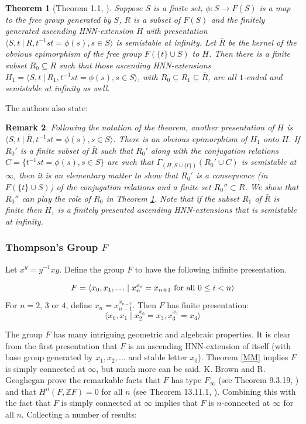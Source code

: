 \documentclass[12pt]{article}
\newtheorem{theorem}{Theorem}[subsection]
\newtheorem{remark}[theorem]{Remark}
\begin{document}
\begin{theorem} [Theorem 1.1, \cite{LM23}]  \label{thmfg} Suppose $S$ is a finite set, $\phi : S \to F(S)$ is a map to the free group generated by $S$, $R$ is a subset of $F(S)$ and the finitely generated ascending HNN-extension $H$ with presentation $\langle S, t \ |\  R, t^{-1} s t = \phi(s), s \in S \rangle$ is semistable at infinity. Let $\bar R$ be the kernel of the obvious epimorphism of the free group $F(\{t\}\cup S)$ to $H$.  Then there is a finite subset $R_0 \subseteq R$ such that those ascending HNN-extensions $H_1=\langle S, t \ |\  R_1, t^{-1} s t = \phi(s), s \in S \rangle$, with $R_0 \subseteq R_1 \subseteq \bar R$, are all $1$-ended and semistable at infinity as well. \end{theorem}
The authors also state:
\begin{remark}
Following the notation of the theorem, another presentation of $H$ is $\langle S, t \ |\  \bar R, t^{-1} s t = \phi(s), s \in S \rangle$. There is an  obvious epimorphism of $H_1$ onto $H$. If $R_0'$ is a finite subset of $\bar R$ such that $R_0'$ along with the conjugation relations $C=\{t^{-1} s t = \phi(s), s \in S\}$ are such that $\Gamma_{(H,S\cup \{t\})}(R_0'\cup C)$ is semistable at $\infty$, then it is an elementary matter to show that $R_0'$ is a consequence (in $F(\{t\}\cup S)$) of the conjugation relations and a finite set $R_0''\subset R$. We show that $R_0''$ can play the role of $R_0$ in Theorem \ref{thmfg}. Note that if the subset $R_1$ of $\bar R$ is finite then $H_1$ is a finitely presented ascending HNN-extensions that is semistable at infinity.
\end{remark}


\subsubsection{Thompson's Group $F$} \label{TGF} 
Let $x^y=y^{-1}xy$. Define the group $F$ to have the following infinite presentation.

$$F=\langle x_0,x_1,\ldots \mid x_n^{x_i}=x_{n+1} \hbox{ for all } 0\leq i<n\rangle$$
For $n=2$, $3$ or $4$, define $x_n=x_{n-1} ^{x_{n-2}}$. Then $F$ has finite presentation:
$$\langle x_0,x_1\mid  x_2^{x_0}=x_3, x_3^{x_1} =x_4\rangle$$

The group $F$ has many intriguing geometric and algebraic properties. It is clear from the first presentation that $F$ is an ascending HNN-extension of itself (with base group generated by $x_1, x_2, \ldots$ and stable letter $x_0$).  Theorem \ref{MM} implies $F$ is simply connected at $\infty$, but much more can be said. K. Brown and R. Geoghegan \cite{BG84} prove the remarkable facts that $F$ has type $F_{\infty}$ (see Theorem 9.3.19, \cite{G}) and that $H^n(F,\mathbb ZF)=0$ for all $n$ (see Theorem 13.11.1, \cite{G}). Combining this with the fact that $F$ is simply connected at $\infty$ implies that $F$ is $n$-connected at $\infty$ for all $n$. Collecting a number of results:
\end{document}
